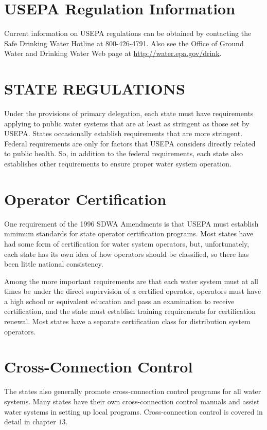 \documentclass[10pt]{article}
\begin{document}
\section{USEPA Regulation Information}
Current information on USEPA regulations can be obtained by contacting the Safe Drinking Water Hotline at 800-426-4791. Also see the Office of Ground Water and Drinking Water Web page at \href{http://water.epa.gov/drink}{http://water.epa.gov/drink}.

\section{STATE REGULATIONS}
Under the provisions of primacy delegation, each state must have requirements applying to public water systems that are at least as stringent as those set by USEPA. States occasionally establish requirements that are more stringent. Federal requirements are only for factors that USEPA considers directly related to public health. So, in addition to the federal requirements, each state also establishes other requirements to ensure proper water system operation.

\section{Operator Certification}
One requirement of the 1996 SDWA Amendments is that USEPA must establish minimum standards for state operator certification programs. Most states have had some form of certification for water system operators, but, unfortunately, each state has its own idea of how operators should be classified, so there has been little national consistency.

Among the more important requirements are that each water system must at all times be under the direct supervision of a certified operator, operators must have a high school or equivalent education and pass an examination to receive certification, and the state must establish training requirements for certification renewal. Most states have a separate certification class for distribution system operators.

\section{Cross-Connection Control}
The states also generally promote cross-connection control programs for all water systems. Many states have their own cross-connection control manuals and assist water systems in setting up local programs. Cross-connection control is covered in detail in chapter $13 .$
\end{document}
